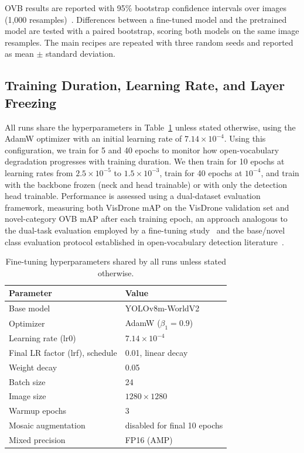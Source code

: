 \documentclass[conf]{new-aiaa}
\begin{document}
OVB results are reported with 95\% bootstrap confidence intervals over images (1,000
resamples)~\cite{efron1994bootstrap}. Differences between a fine-tuned model and the
pretrained model are tested with a paired bootstrap, scoring both models on the same image
resamples. The main recipes are repeated with three random seeds and reported as mean
$\pm$ standard deviation.

\subsection{Training Duration, Learning Rate, and Layer Freezing}

All runs share the hyperparameters in Table~\ref{tab:hyperparams} unless stated otherwise,
using the AdamW optimizer with an initial learning rate of $7.14\times10^{-4}$. Using this
configuration, we train for 5 and 40 epochs to monitor how open-vocabulary degradation
progresses with training duration. We then train for 10 epochs at learning rates from
$2.5\times10^{-5}$ to $1.5\times10^{-3}$, train for 40 epochs at $10^{-4}$, and train with the
backbone frozen (neck and head trainable) or with only the detection head trainable.
Performance is assessed using a dual-dataset evaluation framework, measuring both VisDrone
mAP on the VisDrone validation set and novel-category OVB mAP after each training epoch, an
approach analogous to the dual-task evaluation employed by a fine-tuning
study~\cite{gandhi2025finetuningforgettingadaptationyolov8} and the base/novel class
evaluation protocol established in open-vocabulary detection
literature~\cite{zareian2021ovrcnn}.

\begin{table}[hbt!]
\caption{Fine-tuning hyperparameters shared by all runs unless stated otherwise.}
\label{tab:hyperparams}
\centering
\begin{tabular}{ll}
\hline
\textbf{Parameter} & \textbf{Value} \\
\hline
Base model                       & YOLOv8m-WorldV2 \\
Optimizer                        & AdamW ($\beta_1 = 0.9$) \\
Learning rate (lr0)              & $7.14 \times 10^{-4}$ \\
Final LR factor (lrf), schedule  & 0.01, linear decay \\
Weight decay                     & 0.05 \\
Batch size                       & 24 \\
Image size                       & $1280 \times 1280$ \\
Warmup epochs                    & 3 \\
Mosaic augmentation              & disabled for final 10 epochs \\
Mixed precision                  & FP16 (AMP) \\
\hline
\end{tabular}
\end{table}
\end{document}
